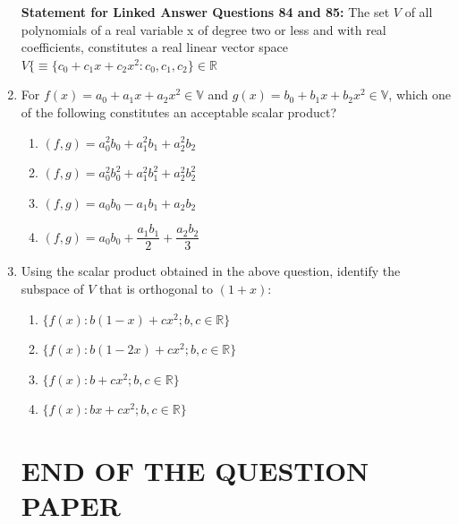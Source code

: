 \documentclass[journal,12pt,onecolumn]{IEEEtran}
\theoremstyle{remark}
\begin{document}
\begin{enumerate}
\vspace{0.5 mm}
\textbf{Statement for Linked Answer Questions 84 and 85:} 
The set $V$ of all polynomials of a real variable x of degree two or less and with real coefficients, constitutes a real linear vector space $V \{\equiv \{ c_{0} + c_{1}x + c_{2}x^{2} : c_{0}, c_{1}, c_{2}\} \in \mathbb{R}$ 

\item For $f(x)=a_0 + a_1x + a_2 x^2 \in\mathbb{V}$ and $g(x) = b_0 + b_1 x + b_2  x^2 \in\mathbb{V} $, which one of the following constitutes an acceptable scalar product?
\hfill{}
\begin{multicols}{2}
\begin{enumerate}
    \item $(f,g)=a_0^2 b_0 + a_1^2 b_1 + a_2^2 b_2$
    \item $(f,g)=a_0^2 b_0^2 + a_1^2 b_1^2 + a_2^2 b_2^2$
    \item $(f,g)=a_0 b_0 - a_1 b_1 + a_2 b_2$
    \item $(f,g)=a_0 b_0 + \dfrac{a_1 b_1}{2} + \dfrac{a_2 b_2}{3}$
\end{enumerate}
\end{multicols}

\item Using the scalar product obtained in the above question, identify the subspace of $V$ that is orthogonal to $(1 + x)$:
\hfill{}
\begin{multicols}{2}
\begin{enumerate}
    \item $\{f(x): b(1-x)+c x^2 ; b,c\in\mathbb{R}\}$
    \item $\{f(x): b(1-2x)+c x^2 ; b,c\in\mathbb{R}\}$
    \item $\{f(x):b + c x^2 ; b,c\in\mathbb{R}\}$
    \item $\{f(x): b x + c x^2 ; b,c\in\mathbb{R}\}$
\end{enumerate}
\end{multicols}
\vspace{2mm}
\begin{center}
    \section*{END OF THE QUESTION PAPER}
\end{center}
\end{enumerate}
\end{document}
